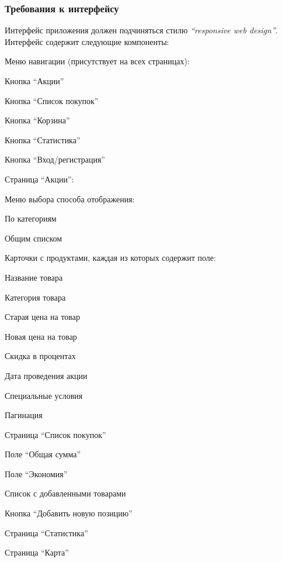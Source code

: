 \subsubsection{Требования к интерфейсу}
Интерфейс приложения должен подчиняться стилю \textit{``responsive web design''}.\\
Интерфейс содержит следующие компоненты:
\begin{my_enumerate}
  \item Меню навигации (присутствует на всех страницах):
  \begin{my_enumerate}
    \item Кнопка ``Акции''
    \item Кнопка ``Список покупок''
    \item Кнопка ``Корзина''
    \item Кнопка ``Статистика''
    \item Кнопка ``Вход/регистрация''
  \end{my_enumerate}
  \item Страница ``Акции'':
  \begin{my_enumerate}
    \item Меню выбора способа отображения:
    \begin{my_enumerate}
      \item По категориям
      \item Общим списком
    \end{my_enumerate}
    \item Карточки с продуктами, каждая из которых содержит поле:
    \begin{my_enumerate}
      \item Название товара
      \item Категория товара
      \item Старая цена на товар
      \item Новая цена на товар
      \item Скидка в процентах
      \item Дата проведения акции
      \item Специальные условия
    \end{my_enumerate}
    \item Пагинация
  \end{my_enumerate}
  \item Страница ``Список покупок''
  \begin{my_enumerate}
    \item Поле ``Общая сумма''
    \item Поле ``Экономия''
    \item Список с добавленными товарами
    \item Кнопка ``Добавить новую позицию''
  \end{my_enumerate}
  \item Страница ``Статистика''
  \item Страница ``Карта''
\end{my_enumerate}


